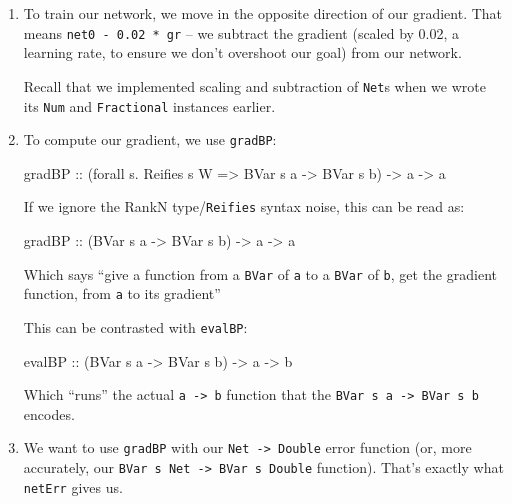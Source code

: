 \documentclass[]{article}
\newenvironment{Shaded}{}{}
\newcommand{\DataTypeTok}[1]{\textcolor[rgb]{0.56,0.13,0.00}{#1}}
\newcommand{\FunctionTok}[1]{\textcolor[rgb]{0.02,0.16,0.49}{#1}}
\newcommand{\NormalTok}[1]{#1}
\newcommand{\OtherTok}[1]{\textcolor[rgb]{0.00,0.44,0.13}{#1}}
\begin{document}
\begin{enumerate}
\def\labelenumi{\arabic{enumi}.}
\item
  To train our network, we move in the opposite direction of our gradient. That
  means \texttt{net0\ -\ 0.02\ *\ gr} -- we subtract the gradient (scaled by
  0.02, a learning rate, to ensure we don't overshoot our goal) from our
  network.

  Recall that we implemented scaling and subtraction of \texttt{Net}s when we
  wrote its \texttt{Num} and \texttt{Fractional} instances earlier.
\item
  To compute our gradient, we use \texttt{gradBP}:

\begin{Shaded}
\begin{Highlighting}[]
\OtherTok{gradBP ::}\NormalTok{ (forall s}\FunctionTok{.} \DataTypeTok{Reifies}\NormalTok{ s }\DataTypeTok{W} \OtherTok{=>} \DataTypeTok{BVar}\NormalTok{ s a }\OtherTok{->} \DataTypeTok{BVar}\NormalTok{ s b) }\OtherTok{->}\NormalTok{ a }\OtherTok{->}\NormalTok{ a}
\end{Highlighting}
\end{Shaded}

  If we ignore the RankN type/\texttt{Reifies} syntax noise, this can be read
  as:

\begin{Shaded}
\begin{Highlighting}[]
\OtherTok{gradBP ::}\NormalTok{ (}\DataTypeTok{BVar}\NormalTok{ s a }\OtherTok{->} \DataTypeTok{BVar}\NormalTok{ s b) }\OtherTok{->}\NormalTok{ a }\OtherTok{->}\NormalTok{ a}
\end{Highlighting}
\end{Shaded}

  Which says ``give a function from a \texttt{BVar} of \texttt{a} to a
  \texttt{BVar} of \texttt{b}, get the gradient function, from \texttt{a} to its
  gradient''

  This can be contrasted with \texttt{evalBP}:

\begin{Shaded}
\begin{Highlighting}[]
\OtherTok{evalBP ::}\NormalTok{ (}\DataTypeTok{BVar}\NormalTok{ s a }\OtherTok{->} \DataTypeTok{BVar}\NormalTok{ s b) }\OtherTok{->}\NormalTok{ a }\OtherTok{->}\NormalTok{ b}
\end{Highlighting}
\end{Shaded}

  Which ``runs'' the actual \texttt{a\ -\textgreater{}\ b} function that the
  \texttt{BVar\ s\ a\ -\textgreater{}\ BVar\ s\ b} encodes.
\item
  We want to use \texttt{gradBP} with our \texttt{Net\ -\textgreater{}\ Double}
  error function (or, more accurately, our
  \texttt{BVar\ s\ Net\ -\textgreater{}\ BVar\ s\ Double} function). That's
  exactly what \texttt{netErr} gives us.


\end{enumerate}
\end{document}
